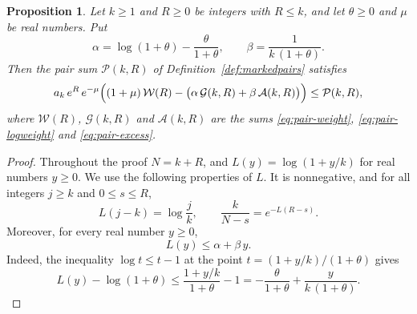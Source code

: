 \documentclass{amsart}
\newtheorem{proposition}[theorem]{Proposition}
\theoremstyle{definition}
\theoremstyle{remark}
\numberwithin{equation}{section}
\begin{document}
\begin{proposition}\label{prop:pairlower}
Let $k\ge1$ and $R\ge0$ be integers with $R\le k$, and let $\theta\ge0$ and
$\mu$ be real numbers. Put
\[
\alpha=\log(1+\theta)-\frac{\theta}{1+\theta},\qquad
\beta=\frac{1}{k\,(1+\theta)}.
\]
Then the pair sum $\mathcal P(k,R)$ of Definition~\ref{def:markedpairs}
satisfies
\[
a_k\,e^{R}\,e^{-\mu}\Bigl((1+\mu)\,\mathcal W(R)
-\bigl(\alpha\,\mathcal G(k,R)+\beta\,\mathcal A(k,R)\bigr)\Bigr)
\le\mathcal P(k,R),
\]
where $\mathcal W(R)$, $\mathcal G(k,R)$ and $\mathcal A(k,R)$ are the sums
\eqref{eq:pair-weight}, \eqref{eq:pair-logweight} and
\eqref{eq:pair-excess}.
\end{proposition}

\begin{proof}
Throughout the proof $N=k+R$, and $L(y)=\log(1+y/k)$ for real numbers
$y\ge0$. We use the following properties of $L$. It is nonnegative, and for
all integers $j\ge k$ and $0\le s\le R$,
\begin{equation}\label{eq:pair-logexcess}
L(j-k)=\log\frac jk,\qquad\frac{k}{N-s}=e^{-L(R-s)}.
\end{equation}
Moreover, for every real number $y\ge0$,
\begin{equation}\label{eq:pair-line}
L(y)\le\alpha+\beta\,y.
\end{equation}
Indeed, the inequality $\log t\le t-1$ at the point $t=(1+y/k)/(1+\theta)$
gives
\[
L(y)-\log(1+\theta)\le\frac{1+y/k}{1+\theta}-1
=-\frac{\theta}{1+\theta}+\frac{y}{k\,(1+\theta)}.
\]


\end{proof}
\end{document}
